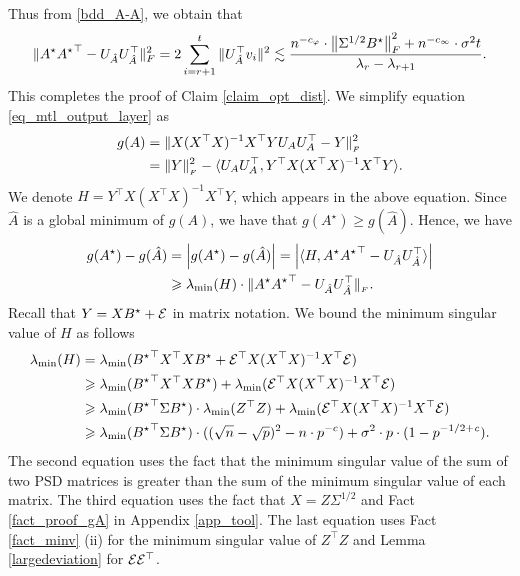 	Thus from \eqref{bdd_A-A}, we obtain that 
	$$\| A^\star {A^\star}^\top -U_{\hat A}U^\top_{\hat A}\|_F^2  =2 \sum_{i=r+1}^t \| U^\top_{\hat A} v_i\|^2 \lesssim \frac{n^{-c_\varphi}\cdot  \left\| \Sigma^{1/2} B^{\star} \right\|_{F}^2 + n^{-c_\infty}\cdot \sigma^2 t}{\lambda_r- \lambda_{r+1}}.$$
	This completes the proof of Claim \ref{claim_opt_dist}.
	\iffalse
	We simplify equation \eqref{eq_mtl_output_layer} as
	\begin{align*}
		g(A)  &= \|X (X^{\top}X)^{-1} X^{\top} Y U_A U_A^{\top} - Y\|_{_{F}}^2 \\
					&= \|Y\|_{_{F}}^2 - \langle U_A U_A^{\top}, Y^{\top} X (X^{\top} X)^{-1} X^{\top} Y \rangle.
	\end{align*}
	We denote $H = Y^{\top} X (X^{\top} X)^{-1} X^{\top} Y$, which appears in the above equation.
	Since $\hat{A}$ is a global minimum of $g(A)$, we have that $g(A^{\star}) \ge g(\hat{A})$.
	Hence, we have
	\begin{align}
		g(A^{\star}) - g(\hat{A}) &= \left\lvert g(A^{\star}) - g(\hat{A})\right\rvert = \left\lvert\langle H, A^{\star} {A^{\star}}^{\top} - U_{\hat{A}} U_{\hat{A}}^{\top} \rangle\right\rvert \nonumber \\
												&\geqslant \lambda_{\min}(H) \cdot \|A^{\star} {A^{\star}}^{\top} - U_{\hat{A}} U_{\hat{A}}^{\top}\|_{_{F}}. \label{eq_g_gap1}
	\end{align}
	Recall that $Y = X B^{\star} + \mathcal{E}$ in matrix notation.
	We bound the minimum singular value of $H$ as follows
	\begin{align}
		\lambda_{\min}(H) &= \lambda_{\min}({B^{\star}}^{\top} X^{\top} X B^{\star} + \mathcal{E}^{\top} X (X^{\top} X)^{-1} X^{\top} \mathcal{E}) \nonumber \\
		&\geqslant \lambda_{\min}({B^{\star}}^{\top}X^{\top}X B^{\star}) + \lambda_{\min}(\mathcal{E}^{\top} X (X^{\top} X)^{-1} X^{\top} \mathcal{E}) \nonumber \\
		&\geqslant \lambda_{\min}({B^{\star}}^{\top}\Sigma B^{\star}) \cdot \lambda_{\min}(Z^{\top}Z) + \lambda_{\min}(\mathcal{E}^{\top} X (X^{\top} X)^{-1} X^{\top} \mathcal{E}) \nonumber \\
		&\geqslant \lambda_{\min}({B^{\star}}^{\top}\Sigma B^{\star}) \cdot ((\sqrt n - \sqrt p)^2 - n \cdot p^{-c}) + \sigma^2 \cdot p \cdot (1 - p^{-1/2 + {\mathit{c}}}). \label{eq_g_gap2}
	\end{align}
	The second equation uses the fact that the minimum singular value of the sum of two PSD matrices is greater than the sum of the minimum singular value of each matrix.
	The third equation uses the fact that $X = Z \Sigma^{1/2}$ and Fact \ref{fact_proof_gA} in Appendix \ref{app_tool}.
	The last equation uses Fact \ref{fact_minv} (ii) for the minimum singular value of $Z^{\top}Z$ and Lemma \ref{largedeviation} for $\mathcal{E}\mathcal{E}^{\top}$.

